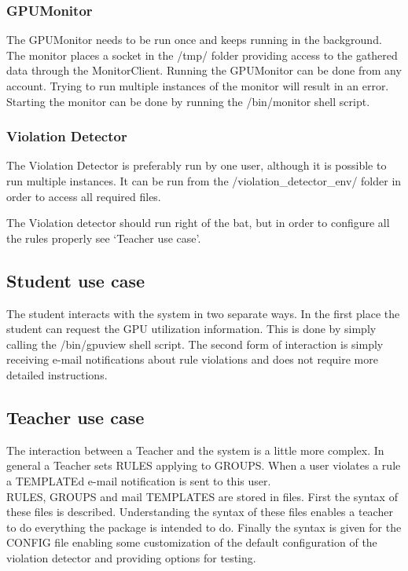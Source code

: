 \documentclass[10pt]{article}
\begin{document}
\subsubsection{GPUMonitor}
The GPUMonitor needs to be run once and keeps running in the background.
The monitor places a socket in the /tmp/ folder providing access to the
gathered data through the MonitorClient. Running the GPUMonitor can be 
done from any account. Trying to run multiple instances of the monitor 
will result in an error. Starting the monitor can be done by running the
/bin/monitor shell script.

\subsubsection{Violation Detector}
The Violation Detector is preferably run by one user, although it is 
possible to run multiple instances. It can be run from the 
/violation\_detector\_env/ folder in order to access all required files.

The Violation detector should run right of the bat, but in order
to configure all the rules properly see `Teacher use case'.
    
\subsection{Student use case}
The student interacts with the system in two separate ways. In the
first place the student can request the GPU utilization information.
This is done by simply calling the /bin/gpuview shell script.
The second form of interaction is simply receiving e-mail notifications
about rule violations and does not require more detailed instructions. 

\subsection{Teacher use case}
The interaction between a Teacher and the system is a little more
complex. In general a Teacher sets RULES applying to GROUPS. When
a user violates a rule a TEMPLATEd e-mail notification is sent to 
this user. \\

RULES, GROUPS and mail TEMPLATES are stored in files. First the syntax of these files is described. Understanding the syntax of these files enables a teacher to do everything the package is intended to do. Finally the syntax is given for the CONFIG file enabling some customization of the default configuration of the violation detector and providing options for testing. 
\end{document}
